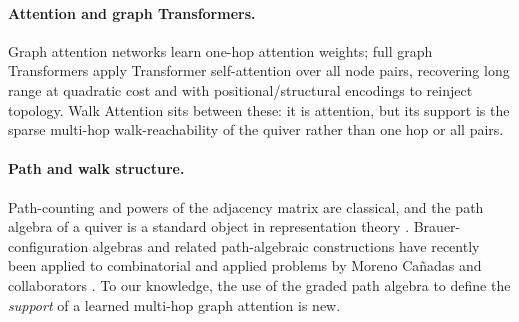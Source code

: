 \documentclass[runningheads]{llncs}
\begin{document}
\paragraph{Attention and graph Transformers.}
Graph attention networks \cite{velickovic2017graph} learn one-hop attention
weights; full graph Transformers apply Transformer self-attention
\cite{vaswani2017attention} over all node pairs, recovering long range at
quadratic cost and with positional/structural encodings to reinject topology.
Walk Attention sits between these: it is attention, but its support is the sparse
multi-hop walk-reachability of the quiver rather than one hop or all pairs.

\paragraph{Path and walk structure.}
Path-counting and powers of the adjacency matrix are classical, and the path
algebra of a quiver is a standard object in representation theory
\cite{schiffler2014quiver,assem2006elements}. Brauer-configuration algebras and
related path-algebraic constructions have recently been applied to combinatorial
and applied problems by Moreno Ca\~nadas and collaborators
\cite{moreno2021brauer,moreno2024integer}. To our knowledge, the use of the
graded path algebra to define the \emph{support} of a learned multi-hop graph
attention is new.








\end{document}
